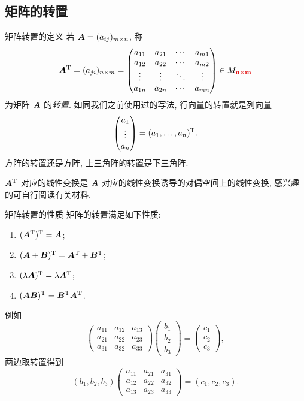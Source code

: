 \subsection{矩阵的转置}

\begin{frame}{矩阵转置的定义}
	\onslide<+->
	若 ${\boldsymbol{A}}=(a_{ij})_{m\times n}$, 称
	\[\bfA^\rmT=(a_{ji})_{n\times m}=\begin{pmatrix}
		a_{11}&a_{21}&\cdots&a_{m1}\\
		a_{12}&a_{22}&\cdots&a_{m2}\\
		\vdots&\vdots&\ddots&\vdots\\
		a_{1n}&a_{2n}&\cdots&a_{mn}
	\end{pmatrix}\in M_{\alert{n\times m}}\]
	为矩阵 ${\boldsymbol{A}}$ 的\emph{转置}.
	\onslide<+->
	如同我们之前使用过的写法, 行向量的转置就是列向量
	\[\begin{pmatrix}
			a_1\\\vdots\\a_n
		\end{pmatrix}=(a_1,\dots,a_n)^{\mathrm{T}}.\]
	\onslide<+->
	方阵的转置还是方阵, 上三角阵的转置是下三角阵.

	\onslide<+->
	${\boldsymbol{A}}^{\mathrm{T}}$ 对应的线性变换是 ${\boldsymbol{A}}$ 对应的线性变换诱导的对偶空间上的线性变换, 感兴趣的可自行阅读有关材料.
\end{frame}


\begin{frame}{矩阵转置的性质}
	\onslide<+->
	矩阵的转置满足如下性质:
	\begin{enumerate}
		\item $({\boldsymbol{A}}^{\mathrm{T}})^{\mathrm{T}}={\boldsymbol{A}}$;
		\item $({\boldsymbol{A}}+{\boldsymbol{B}})^{\mathrm{T}}={\boldsymbol{A}}^{\mathrm{T}}+{\boldsymbol{B}}^{\mathrm{T}}$;
		\item $(\lambda{\boldsymbol{A}})^{\mathrm{T}}=\lambda{\boldsymbol{A}}^{\mathrm{T}}$;
		\item \alert{$({\boldsymbol{A}}{\boldsymbol{B}})^{\mathrm{T}}={\boldsymbol{B}}^{\mathrm{T}}{\boldsymbol{A}}^{\mathrm{T}}$}.
	\end{enumerate}
	\onslide<+->
	例如
	\[\begin{pmatrix}
		a_{11}&a_{12}&a_{13}\\
		a_{21}&a_{22}&a_{23}\\
		a_{31}&a_{32}&a_{33}
	\end{pmatrix}\begin{pmatrix}
		b_1\\b_2\\b_3
	\end{pmatrix}=\begin{pmatrix}
		c_1\\c_2\\c_3
	\end{pmatrix},\]
	\onslide<+->
	两边取转置得到
	\[(b_1,b_2,b_3)\begin{pmatrix}
		a_{11}&a_{21}&a_{31}\\
		a_{12}&a_{22}&a_{32}\\
		a_{13}&a_{23}&a_{33}
	\end{pmatrix}=(c_1,c_2,c_3).\]
\end{frame}


